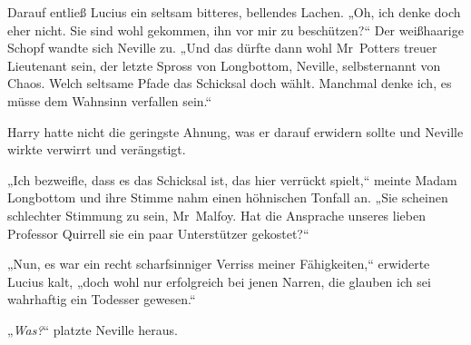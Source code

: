 Darauf entließ Lucius ein seltsam bitteres, bellendes Lachen. „Oh, ich denke doch eher nicht. Sie sind wohl gekommen, ihn vor mir zu beschützen?“ Der weißhaarige Schopf wandte sich Neville zu. „Und das dürfte dann wohl Mr~Potters treuer Lieutenant sein, der letzte Spross von Longbottom, Neville, selbsternannt von Chaos. Welch seltsame Pfade das Schicksal doch wählt. Manchmal denke ich, es müsse dem Wahnsinn verfallen sein.“

Harry hatte nicht die geringste Ahnung, was er darauf erwidern sollte und Neville wirkte verwirrt und verängstigt.

„Ich bezweifle, dass es das Schicksal ist, das hier verrückt spielt,“ meinte Madam Longbottom und ihre Stimme nahm einen höhnischen Tonfall an. „Sie scheinen schlechter Stimmung zu sein, Mr~Malfoy. Hat die Ansprache unseres lieben Professor Quirrell sie ein paar Unterstützer gekostet?“

„Nun, es war ein recht scharfsinniger Verriss meiner Fähigkeiten,“ erwiderte Lucius kalt, „doch wohl nur erfolgreich bei jenen Narren, die glauben ich sei wahrhaftig ein Todesser gewesen.“

„\emph{Was?}“ platzte Neville heraus.

